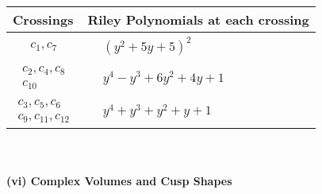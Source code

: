 \documentclass[1p]{elsarticle_modified}
\theoremstyle{definition}
\begin{document}
\begin{tabular}{m{50pt}|m{274pt}}
Crossings & \hspace{64pt}Riley Polynomials at each crossing \\
\hline $$\begin{aligned}c_{1},c_{7}\end{aligned}$$&$\begin{aligned}
&(y^2+5 y+5)^2
\end{aligned}$\\
\hline $$\begin{aligned}c_{2},c_{4},c_{8}\\c_{10}\end{aligned}$$&$\begin{aligned}
&y^4- y^3+6 y^2+4 y+1
\end{aligned}$\\
\hline $$\begin{aligned}c_{3},c_{5},c_{6}\\c_{9},c_{11},c_{12}\end{aligned}$$&$\begin{aligned}
&y^4+y^3+y^2+y+1
\end{aligned}$\\
\hline
\end{tabular}\\~\\
\newpage\flushleft \textbf{(vi) Complex Volumes and Cusp Shapes}
\end{document}

